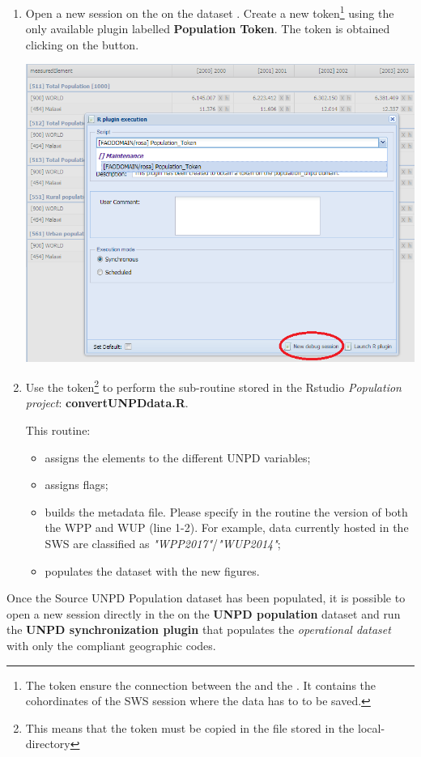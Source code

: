 \documentclass[nojss]{jss}\usepackage[]{graphicx}\usepackage[]{color}
\begin{document}
\begin{enumerate}
\item{Open a new session on the  on the dataset . Create a new token\footnote{The token ensure the connection between the  and the . It contains the cohordinates of the SWS session where the data has to to be saved.} using the only available plugin labelled \textbf{Population Token}. The token is obtained clicking on the  button.
\begin{center}
\includegraphics{SourceToken.PNG}
\end{center}
}

\item{Use the token\footnote{This means that the token must be copied in the  file stored in the local-directory} to perform the sub-routine stored in the Rstudio \textit{Population project}: \textbf{convertUNPDdata.R}.

This routine:
\begin{itemize}
\item{assigns the  elements to the different UNPD variables;}
\item{assigns  flags;}
\item{builds the  metadata file. Please specify in the routine the version of both the WPP and WUP (line 1-2). For example, data currently hosted in the SWS are classified as \textit{"WPP2017"}/\textit{"WUP2014"};}
\item{populates the  dataset with the new figures.}
\end{itemize}

}

\end{enumerate}




Once the Source UNPD Population dataset has been populated, it is possible to open a new session directly in the  on the \textbf{UNPD population} dataset and run the \textbf{UNPD synchronization plugin} that populates the \textit{operational dataset} with only the  compliant geographic codes.
\end{document}
